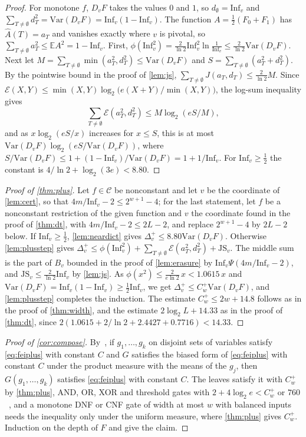 \documentclass[11pt]{amsart}
\theoremstyle{remark}
\newcommand{\E}{\mathbb{E}}
\newcommand{\Inf}{\mathrm{Inf}}
\newcommand{\Var}{\mathrm{Var}}
\newcommand{\JS}{\mathrm{JS}}
\begin{document}
\begin{proof}
For monotone $f$, $D_vF$ takes the values $0$ and $1$, so $d_\emptyset=\Inf_v$ and
$\sum_{T\neq\emptyset}d_T^2=\Var(D_vF)=\Inf_v(1-\Inf_v)$. The function $A=\frac12(F_0+F_1)$ has
$\widehat A(T)=a_T$ and vanishes exactly where $v$ is pivotal, so $\sum_{T\neq\emptyset}a_T^2\le\E A^2=1-\Inf_v$. First,
$\phi(\Inf_v^2)=\frac2{\ln2}\Inf_v^2\ln\frac1{\Inf_v}\le\frac2{\ln2}\Var(D_vF)$. Next let
$M=\sum_{T\neq\emptyset}\min(a_T^2,d_T^2)\le\Var(D_vF)$ and $S=\sum_{T\neq\emptyset}(a_T^2+d_T^2)$. By the pointwise
bound in the proof of \cref{lem:js}, $\sum_{T\neq\emptyset}J(a_T,d_T)\le\frac2{\ln2}M$. Since
$\mathcal E(X,Y)\le\min(X,Y)\log_2\bigl(e(X+Y)/\min(X,Y)\bigr)$, the log-sum inequality gives
\[
\sum_{T\neq\emptyset}\mathcal E(a_T^2,d_T^2)\le M\log_2(eS/M),
\]
and as $x\log_2(eS/x)$ increases for $x\le S$,
this is at most $\Var(D_vF)\log_2(eS/\Var(D_vF))$, where $S/\Var(D_vF)\le1+(1-\Inf_v)/\Var(D_vF)=1+1/\Inf_v$. For
$\Inf_v\ge\frac12$ the constant is $4/\ln2+\log_2(3e)<8.80$.
\end{proof}

\begin{proof}[Proof of \cref{thm:plus}]
Let $f\in\mathcal C$ be nonconstant and let $v$ be the coordinate of \cref{lem:cert}, so that
$4m/\Inf_v-2\le2^{w+1}-4$; for the last statement, let $f$ be a nonconstant restriction of the given function and $v$ the
coordinate found in the proof of \cref{thm:dt}, with $4m/\Inf_v-2\le2L-2$, and replace $2^{w+1}-4$ by $2L-2$ below. If
$\Inf_v\ge\frac12$, \cref{lem:neardict} gives $\Delta^+_v\le8.80\Var(D_vF)$. Otherwise
\cref{lem:plusstep} gives $\Delta^+_v\le\phi(\Inf_v^2)+\sum_{T\neq\emptyset}\mathcal E(a_T^2,d_T^2)+\JS_v$. The middle
sum is the part of $B_v$ bounded in the proof of \cref{lem:erasure} by $\Inf_v\Psi(4m/\Inf_v-2)$, and
$\JS_v\le\frac2{\ln2}\Inf_v$ by \cref{lem:js}. As $\phi(x^2)\le\frac2{e\ln2}\,x<1.0615\,x$ and
$\Var(D_vF)=\Inf_v(1-\Inf_v)\ge\frac12\Inf_v$, we get $\Delta^+_v\le C^+_w\Var(D_vF)$, and \cref{lem:plusstep}
completes the induction. The estimate $C^+_w\le2w+14.8$ follows as in the proof of \cref{thm:width}, and the estimate
$2\log_2L+14.33$ as in the proof of \cref{thm:dt}, since $2(1.0615+2/\ln2+2.4427+0.7716)<14.33$.
\end{proof}

\begin{proof}[Proof of \cref{cor:compose}]
By~\cite[Theorem~1]{OT13}, if $g_1,\dots,g_k$ on disjoint sets of variables satisfy \eqref{eq:feiplus} with constant $C$
and $G$ satisfies the biased form of \eqref{eq:feiplus} with constant $C$ under the product measure with the means of
the $g_j$, then $G(g_1,\dots,g_k)$ satisfies \eqref{eq:feiplus} with constant $C$. The leaves satisfy it with $C^+_w$ by
\cref{thm:plus}, AND, OR, XOR and threshold gates with $2+4\log_2e<C^+_w$ or $760$~\cite{Shm26}, and a monotone DNF or
CNF gate of width at most $w$ with balanced inputs needs the inequality only under the uniform measure, where
\cref{thm:plus} gives $C^+_w$. Induction on the depth of $F$ and \cite[Proposition~2.1]{OT13} give the claim.
\end{proof}
\end{document}

